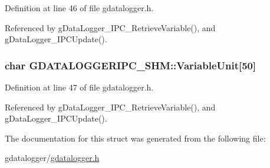 Definition at line 46 of file gdatalogger.\-h.



Referenced by g\-Data\-Logger\-\_\-\-I\-P\-C\-\_\-\-Retrieve\-Variable(), and g\-Data\-Logger\-\_\-\-I\-P\-C\-Update().

\hypertarget{structGDATALOGGERIPC__SHM_a8efd7b2ed8ff087f9694cb47a8c25a13}{
\subsubsection[{Variable\-Unit}]{\setlength{\rightskip}{0pt plus 5cm}char G\-D\-A\-T\-A\-L\-O\-G\-G\-E\-R\-I\-P\-C\-\_\-\-S\-H\-M\-::\-Variable\-Unit\mbox{[}50\mbox{]}}}\label{structGDATALOGGERIPC__SHM_a8efd7b2ed8ff087f9694cb47a8c25a13}


Definition at line 47 of file gdatalogger.\-h.



Referenced by g\-Data\-Logger\-\_\-\-I\-P\-C\-\_\-\-Retrieve\-Variable(), and g\-Data\-Logger\-\_\-\-I\-P\-C\-Update().



The documentation for this struct was generated from the following file\-:\begin{DoxyCompactItemize}
\item 
gdatalogger/\hyperlink{gdatalogger_8h}{gdatalogger.\-h}\end{DoxyCompactItemize}
